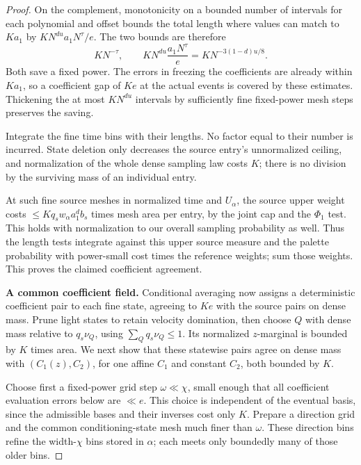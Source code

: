 \begin{proof}
On the complement, monotonicity on a bounded number of intervals
for each polynomial and offset bounds the total length where values
can match to \(Ka_1\) by \(KN^{du}a_1N^\tau/e\).  The two
bounds are therefore
\[
 KN^{-\tau},\qquad
 KN^{du}\frac{a_1N^\tau}{e}
      =KN^{-3(1-d)u/8}.
\]
Both save a fixed power.  The errors in freezing the coefficients
are already within \(Ka_1\), so a coefficient gap of \(Ke\)
at the actual events is covered by these estimates.  Thickening the
at most \(KN^{du}\) intervals by sufficiently fine fixed-power
mesh steps preserves the saving.

Integrate the fine time bins with their lengths.  No factor equal
to their number is incurred.  State deletion only decreases the
source entry's unnormalized ceiling, and normalization of the whole
dense sampling law costs \(K\); there is no division by the
surviving mass of an individual entry.

At such fine source meshes in normalized time and \(U_\alpha\), the source upper weight costs \(\le K q_s w_\alpha a_1^d b_s\) times mesh area per entry, by the joint cap and the \(\Phi_1\) test. This holds with normalization to our overall sampling probability as well. Thus the length tests integrate against this upper source measure and the palette probability with power-small cost times the reference weights; sum those weights. This proves the claimed coefficient agreement.

\par\smallskip\noindent\textbf{A common coefficient field.}\quad
Conditional averaging now assigns a deterministic coefficient pair
to each fine state, agreeing to \(Ke\) with the source pairs on
dense mass. Prune light states to retain velocity domination, then
choose \(Q\) with dense mass relative to \(q_s\nu_Q\), using
\(\sum_Qq_s\nu_Q\le1\). Its normalized \(z\)-marginal is
bounded by \(K\) times area. We next show that these statewise
pairs agree on dense mass with \((C_1(z),C_2)\), for one affine
\(C_1\) and constant \(C_2\), both bounded by \(K\).

Choose first a fixed-power grid step \(\omega\ll\chi\), small
enough that all coefficient evaluation errors below are \(\ll e\).
This choice is independent of the eventual basis, since the
admissible bases and their inverses cost only \(K\). Prepare a
direction grid and the common conditioning-state mesh much finer
than \(\omega\). These direction bins refine the width-\(\chi\)
bins stored in \(\alpha\); each meets only boundedly many of those
older bins.


\end{proof}
